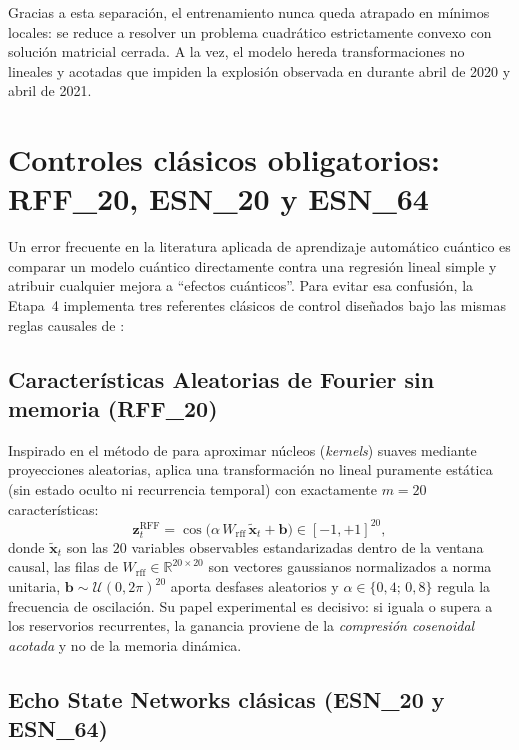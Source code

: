 \documentclass[12pt,letterpaper]{article}
\begin{document}
Gracias a esta separación, el entrenamiento nunca queda atrapado en mínimos locales: se reduce a resolver un problema cuadrático estrictamente convexo con solución matricial cerrada. A la vez, el modelo hereda transformaciones no lineales y acotadas que impiden la explosión observada en  durante abril de 2020 y abril de 2021.

\section{Controles clásicos obligatorios: RFF\_20, ESN\_20 y ESN\_64}

Un error frecuente en la literatura aplicada de aprendizaje automático cuántico es comparar un modelo cuántico directamente contra una regresión lineal simple y atribuir cualquier mejora a ``efectos cuánticos''. Para evitar esa confusión, la Etapa~4 implementa tres referentes clásicos de control diseñados bajo las mismas reglas causales de :

\subsection{Características Aleatorias de Fourier sin memoria (RFF\_20)}

Inspirado en el método de \textcite{rahimi2007} para aproximar núcleos (\emph{kernels}) suaves mediante proyecciones aleatorias,  aplica una transformación no lineal puramente estática (sin estado oculto ni recurrencia temporal) con exactamente \(m = 20\) características:
\begin{equation}
  \mathbf{z}_t^{\text{RFF}} = \cos\bigl(\alpha\, W_{\text{rff}}\,\tilde{\mathbf{x}}_t + \mathbf{b}\bigr) \in [-1, +1]^{20},
  \label{eq:rff}
\end{equation}
donde \(\tilde{\mathbf{x}}_t\) son las \(20\) variables observables estandarizadas dentro de la ventana causal, las filas de \(W_{\text{rff}} \in \mathbb{R}^{20 \times 20}\) son vectores gaussianos normalizados a norma unitaria, \(\mathbf{b} \sim \mathcal{U}(0, 2\pi)^{20}\) aporta desfases aleatorios y \(\alpha \in \{0{,}4;\, 0{,}8\}\) regula la frecuencia de oscilación. Su papel experimental es decisivo: si  iguala o supera a los reservorios recurrentes, la ganancia proviene de la \emph{compresión cosenoidal acotada} y no de la memoria dinámica.

\subsection{Echo State Networks clásicas (ESN\_20 y ESN\_64)}
\end{document}
